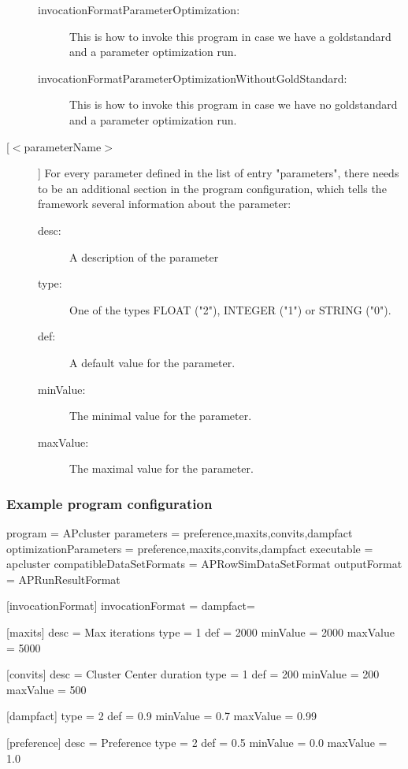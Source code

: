 \begin{description}
\begin{description}
		\item[invocationFormatParameterOptimization:]
			This is how to invoke this program in case we have a goldstandard and a parameter optimization run.
			
		\item[invocationFormatParameterOptimizationWithoutGoldStandard:]
			This is how to invoke this program in case we have no goldstandard and a parameter optimization run.
		\end{description}
		\item[[$<$parameterName$>$]]
			For every parameter defined in the list of entry "parameters", there needs to be an additional section in the program configuration, which tells the framework several information about the parameter:
			\begin{description}
				\item[desc:] A description of the parameter
				\item[type:] One of the types FLOAT ("2"), INTEGER ("1") or STRING ("0").
				\item[def:] A default value for the parameter.
				\item[minValue:] The minimal value for the parameter.
				\item[maxValue:] The maximal value for the parameter.
			\end{description}
	\end{description}
			
		\subsubsection{Example program configuration}
		\begin{listing}{1}
program = APcluster
parameters = preference,maxits,convits,dampfact
optimizationParameters = preference,maxits,convits,dampfact
executable = apcluster
compatibleDataSetFormats = APRowSimDataSetFormat
outputFormat = APRunResultFormat

[invocationFormat]
invocationFormat = %
dampfact=%

[maxits]
desc = Max iterations
type = 1
def = 2000
minValue = 2000
maxValue = 5000

[convits]
desc = Cluster Center duration
type = 1
def = 200
minValue = 200
maxValue = 500

[dampfact]
type = 2
def = 0.9
minValue = 0.7
maxValue = 0.99

[preference]
desc = Preference
type = 2
def = 0.5
minValue = 0.0
maxValue = 1.0		\end{listing}


